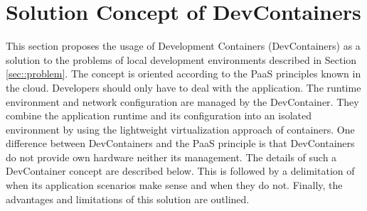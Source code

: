 

\section{Solution Concept of DevContainers}\label{sec::solution_concept}
This section proposes the usage of Development Containers (DevContainers) as a solution to the problems of local development environments described in Section \ref{sec::problem}. The concept is oriented according to the \ac{PaaS} principles known in the cloud. Developers should only have to deal with the application. The runtime environment and network configuration are managed by the DevContainer. They combine the application runtime and its configuration into an isolated environment by using the lightweight virtualization approach of containers. One difference between DevContainers and the \ac{PaaS} principle is that DevContainers do not provide own hardware neither its management. \newline
The details of such a DevContainer concept are described below. This is followed by a delimitation of when its application scenarios make sense and when they do not. Finally, the advantages and limitations of this solution are outlined.

